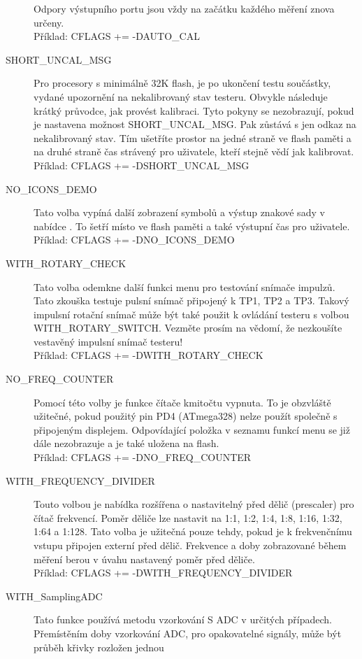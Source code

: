 \begin{description}
Odpory výstupního portu jsou vždy na začátku každého měření znova určeny.\\
Příklad: CFLAGS += -DAUTO\_CAL
  \item[SHORT\_UNCAL\_MSG] Pro procesory s minimálně 32K flash, je po ukončení testu součástky, vydané
upozornění na nekalibrovaný stav testeru.
Obvykle následuje krátký průvodce, jak provést kalibraci.
Tyto pokyny se nezobrazují, pokud je nastavena možnost SHORT\_UNCAL\_MSG.
Pak zůstává s jen odkaz na nekalibrovaný stav.
Tím ušetříte prostor na jedné straně ve flash paměti a na druhé straně čas strávený pro uživatele,
kteří stejně vědí jak kalibrovat.\\
Příklad: CFLAGS += -DSHORT\_UNCAL\_MSG
 \item[NO\_ICONS\_DEMO]
Tato volba vypíná další zobrazení symbolů a výstup znakové sady v nabídce
.
To šetří místo ve flash paměti a také výstupní čas pro uživatele.\\
Příklad: CFLAGS += -DNO\_ICONS\_DEMO
 \item[WITH\_ROTARY\_CHECK]
Tato volba odemkne další funkci menu pro testování snímače impulzů.
Tato zkouška testuje pulsní snímač připojený k TP1, TP2 a TP3.
Takový impulsní rotační snímač může být také použit k ovládání testeru s volbou WITH\_ROTARY\_SWITCH.
Vezměte prosím na vědomí, že nezkoušíte vestavěný impulsní snímač testeru!\\
Příklad: CFLAGS += -DWITH\_ROTARY\_CHECK
 \item[NO\_FREQ\_COUNTER]
Pomocí této volby je funkce čítače kmitočtu vypnuta.
To je obzvláště užitečné, pokud použitý pin PD4 (ATmega328) nelze použít společně s
připojeným displejem.
Odpovídající položka v seznamu funkcí menu se již dále nezobrazuje a je také uložena na flash.\\
Příklad: CFLAGS += -DNO\_FREQ\_COUNTER
 \item[WITH\_FREQUENCY\_DIVIDER]
Touto volbou je nabídka rozšířena o nastavitelný před dělič (prescaler) pro čítač frekvencí.
Poměr děliče lze nastavit na 1:1, 1:2, 1:4, 1:8, 1:16, 1:32, 1:64 a 1:128.
Tato volba je užitečná pouze tehdy, pokud je k frekvenčnímu vstupu připojen externí před dělič.
Frekvence a doby zobrazované během měření berou v úvahu nastavený poměr před děliče.\\
Příklad: CFLAGS += -DWITH\_FREQUENCY\_DIVIDER
  \item[WITH\_SamplingADC] Tato funkce používá metodu vzorkování S ADC v určitých případech.
Přemístěním doby vzorkování ADC, pro opakovatelné signály, může být průběh křivky rozložen jednou

\end{description}
